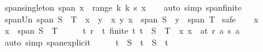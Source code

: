 \begin{isabellebody}
\isanewline
{}\isamarkupfalse%
\ span{\isacharunderscore}{\kern0pt}singleton{\isacharcolon}{\kern0pt}\ {\isachardoublequoteopen}span\ {\isacharbraceleft}{\kern0pt}x{\isacharbraceright}{\kern0pt}\ {\isacharequal}{\kern0pt}\ range\ {\isacharparenleft}{\kern0pt}{\isasymlambda}k{\isachardot}{\kern0pt}\ k\ {\isacharasterisk}{\kern0pt}s\ x{\isacharparenright}{\kern0pt}{\isachardoublequoteclose}\isanewline
%
\isadelimproof
\ \ %
\endisadelimproof
%
\isatagproof
{}\isamarkupfalse%
\ {\isacharparenleft}{\kern0pt}auto\ simp{\isacharcolon}{\kern0pt}\ span{\isacharunderscore}{\kern0pt}finite{\isacharparenright}{\kern0pt}%
\endisatagproof
{\isafoldproof}%
%
\isadelimproof
\isanewline
%
\endisadelimproof
\isanewline
{}\isamarkupfalse%
\ span{\isacharunderscore}{\kern0pt}Un{\isacharcolon}{\kern0pt}\ {\isachardoublequoteopen}span\ {\isacharparenleft}{\kern0pt}S\ {\isasymunion}\ T{\isacharparenright}{\kern0pt}\ {\isacharequal}{\kern0pt}\ {\isacharbraceleft}{\kern0pt}x\ {\isacharplus}{\kern0pt}\ y\ {\isacharbar}{\kern0pt}\ x\ y{\isachardot}{\kern0pt}\ x\ {\isasymin}\ span\ S\ {\isasymand}\ y\ {\isasymin}\ span\ T{\isacharbraceright}{\kern0pt}{\isachardoublequoteclose}\isanewline
%
\isadelimproof
%
\endisadelimproof
%
\isatagproof
{}\isamarkupfalse%
\ safe\isanewline
\ \ \isamarkupfalse%
\ x\ \isamarkupfalse%
\ {\isachardoublequoteopen}x\ {\isasymin}\ span\ {\isacharparenleft}{\kern0pt}S\ {\isasymunion}\ T{\isacharparenright}{\kern0pt}{\isachardoublequoteclose}\isanewline
\ \ \isamarkupfalse%
\ \isamarkupfalse%
\ t\ r\ \ t{\isacharcolon}{\kern0pt}\ {\isachardoublequoteopen}finite\ t{\isachardoublequoteclose}\ {\isachardoublequoteopen}t\ {\isasymsubseteq}\ S\ {\isasymunion}\ T{\isachardoublequoteclose}\ \ x{\isacharcolon}{\kern0pt}\ {\isachardoublequoteopen}x\ {\isacharequal}{\kern0pt}\ {\isacharparenleft}{\kern0pt}{\isasymSum}a{\isasymin}t{\isachardot}{\kern0pt}\ r\ a\ {\isacharasterisk}{\kern0pt}s\ a{\isacharparenright}{\kern0pt}{\isachardoublequoteclose}\isanewline
\ \ \ \ \isamarkupfalse%
\ {\isacharparenleft}{\kern0pt}auto\ simp{\isacharcolon}{\kern0pt}\ span{\isacharunderscore}{\kern0pt}explicit{\isacharparenright}{\kern0pt}\isanewline
\ \ \isamarkupfalse%
\ \isamarkupfalse%
\ {\isachardoublequoteopen}t\ {\isasyminter}\ S\ {\isasymunion}\ {\isacharparenleft}{\kern0pt}t\ {\isacharminus}{\kern0pt}\ S{\isacharparenright}{\kern0pt}\ {\isacharequal}{\kern0pt}\ t{\isachardoublequoteclose}\ \isamarkupfalse%

\end{isabellebody}
